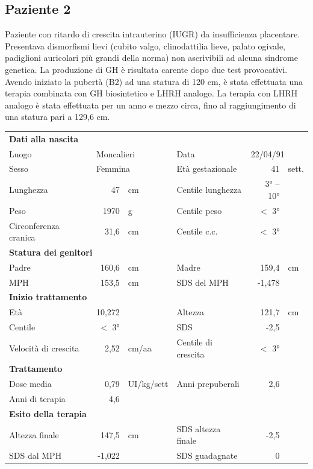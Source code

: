 \subsection*{Paziente 2}%

Paziente con ritardo di crescita intrauterino (IUGR) da insufficienza placentare.
Presentava dismorfismi lievi (cubito valgo, clinodattilia lieve, palato ogivale, padiglioni auricolari più grandi della norma) non ascrivibili ad alcuna sindrome genetica. La produzione di GH è risultata carente dopo due test provocativi. Avendo iniziato la pubertà (B2) ad una statura di 120 cm, è stata effettuata una terapia combinata con GH biosintetico e LHRH analogo. La terapia con LHRH analogo è stata effettuata per un anno e mezzo circa, fino al raggiungimento di una statura pari a 129,6 cm.

\begin{table}[!h]
\begin{tabular}{lrllrl}
\toprule
\multicolumn{6}{l}{\textbf{Dati alla nascita}}\\
Luogo 		& \multicolumn{2}{l}{Moncalieri} 	& Data 					& \multicolumn{2}{l}{22/04/91} 	\\
Sesso 		& \multicolumn{2}{l}{Femmina} 	& Età gestazionale 		& 41 		& sett.\\
Lunghezza 	& 47 		& cm 				& Centile lunghezza		& 3° -- 10°	\\
Peso 		& 1970 		& g					& Centile peso			& $<$ 3° 		\\
Circonferenza cranica	& 31,6 		& cm 	& Centile c.c.			& $<$ 3° \\
\midrule
\multicolumn{6}{l}{\textbf{Statura dei genitori}}\\
Padre 		& 160,6 & cm 	& Madre 				& 159,4 & cm \\
MPH 		& 153,5 & cm 	& SDS del MPH 			& -1,478\\
\midrule
\multicolumn{6}{l}{\textbf{Inizio trattamento}} \\
Età	& 10,272 & 		& Altezza 				& 121,7 & cm  \\
Centile & $<$ 3° 	 &		& SDS		& -2,5 \\
Velocità di crescita & 2,52 & cm/aa	& Centile di crescita & $<$ 3°\\
\midrule
\multicolumn{6}{l}{\textbf{Trattamento}} \\
Dose media		& 0,79 & UI/kg/sett & Anni prepuberali & 2,6\\
Anni di terapia & 4,6\\
\midrule
\multicolumn{6}{l}{\textbf{Esito della terapia}} \\
Altezza finale			& 147,5 & cm 	& SDS altezza finale & -2,5\\
SDS dal MPH	& -1,022 	& 	& SDS guadagnate 			& 0\\
\bottomrule
\end{tabular}
\end{table}



